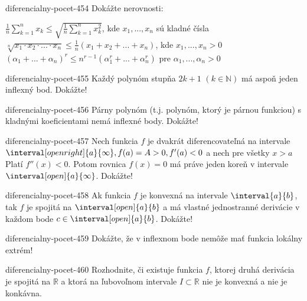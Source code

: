 \begin{defproblem}{diferencialny-pocet-454}
Dokážte nerovnosti:
\begin{tasks}
\task
  $\frac{1}{n}\sum_{k=1}^n x_k\leq \sqrt{\frac{1}{n}\sum_{k=1}^n x^2_{k}}$, kde
  $x_1,...,x_n$ sú kladné čísla
\task
  $\sqrt[n]{x_1\cdot x_2\cdot...\cdot x_n}\leq \frac{1}{n}(x_1+x_2+...+x_n)$,
  kde $x_1,...,x_n>0$
\task
  $(\alpha_1+...+\alpha_n)^r\leq n^{r-1}(\alpha^r_1+...+\alpha^r_n)$ pre
  $\alpha_1,...,\alpha_n>0$
\end{tasks}
\end{defproblem}

\begin{defproblem}{diferencialny-pocet-455}
Každý polynóm stupňa $2k+1$ $(k\in\mathbb{N})$ má aspoň jeden inflexný bod.
Dokážte!
\end{defproblem}

\begin{defproblem}{diferencialny-pocet-456}
Párny polynóm (t.j. polynóm, ktorý je párnou funkciou) s kladnými koeficientami
nemá inflexné body. Dokážte!
\end{defproblem}

\begin{defproblem}{diferencialny-pocet-457}
Nech funkcia $f$ je dvakrát diferencovateľná na intervale $\interval[open
right]{a}{\infty}, f(a) = A > 0,f'(a)<0$ a nech pre všetky $x>a$ Platí
$f''(x)<0$. Potom rovnica $f(x)=0$ má práve jeden koreň v intervale
$\interval[open]{a}{\infty}$. Dokážte!
\end{defproblem}

\begin{defproblem}{diferencialny-pocet-458}
Ak funkcia $f$ je konvexná na intervale $\interval{a}{b}$, tak $f$ je spojitá na
$\interval[open]{a}{b}$ a má vlastné jednostranné derivácie v každom bode $c\in
\interval[open]{a}{b}$. Dokážte!
\end{defproblem}

\begin{defproblem}{diferencialny-pocet-459}
Dokážte, že v inflexnom bode nemôže mať funkcia lokálny extrém!
\end{defproblem}

\begin{defproblem}{diferencialny-pocet-460}
Rozhodnite, či existuje funkcia $f$, ktorej druhá derivácia je spojitá na
$\mathbb{R}$ a ktorá na ľubovoľnom intervale $I \subset\mathbb{R}$ nie je
konvexná a nie je konkávna.
\end{defproblem}

